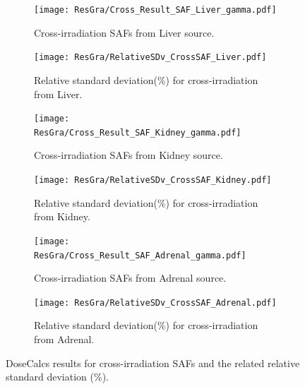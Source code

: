 \documentclass[letterpaper,12pt]{article}
\begin{document}
\begin{figure} [H]
\begin{subfigure}[t]{.5\textwidth}
  \centering
  \texttt{[image: ResGra/Cross\_Result\_SAF\_Liver\_gamma.pdf]}%
	\caption{Cross-irradiation SAFs from Liver source.}%
	\label{fig:CrossResultsLiver}%
\end{subfigure}\hspace{.03\textwidth}
\begin{subfigure}[t]{.5\textwidth}
  \centering
  \texttt{[image: ResGra/RelativeSDv\_CrossSAF\_Liver.pdf]}%
	\caption{Relative standard deviation(\%) for cross-irradiation from Liver.}%
	\label{fig:CrossRelSDLiver}%
	\end{subfigure}\vspace{.06\textwidth}
\begin{subfigure}[t]{0.5\textwidth}
  \centering
  \texttt{[image: ResGra/Cross\_Result\_SAF\_Kidney\_gamma.pdf]}
	\caption{Cross-irradiation SAFs from Kidney source.}
	\label{fig:CrossResultsKidney}
\end{subfigure}\hspace{.03\textwidth}
\begin{subfigure}[t]{0.5\textwidth}
  \centering
  \texttt{[image: ResGra/RelativeSDv\_CrossSAF\_Kidney.pdf]}
	\caption{Relative standard deviation(\%) for cross-irradiation from Kidney.}
	\label{fig:CrossRelSDKidney}
\end{subfigure}\vspace{.06\textwidth}
\begin{subfigure}[t]{0.5\textwidth}
  \centering
  \texttt{[image: ResGra/Cross\_Result\_SAF\_Adrenal\_gamma.pdf]}
	\caption{Cross-irradiation SAFs from Adrenal source.}
	\label{fig:CrossResultsAdrenal}
\end{subfigure}\hspace{.03\textwidth}
\begin{subfigure}[t]{0.5\textwidth}
  \centering
  \texttt{[image: ResGra/RelativeSDv\_CrossSAF\_Adrenal.pdf]}
	\caption{Relative standard deviation(\%) for cross-irradiation from Adrenal.}
	\label{fig:CrossRelSDAdrenal}
\end{subfigure}
\caption{DoseCalcs results for cross-irradiation SAFs and the related relative standard deviation (\%).}
\end{figure}
\end{document}
